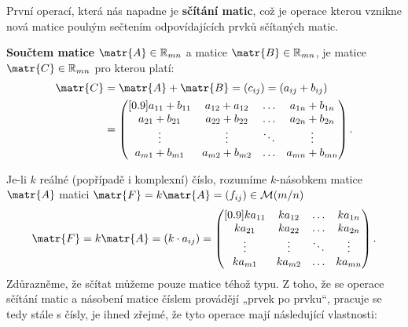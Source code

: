       První operací, která nás napadne je \textbf{sčítání matic}, což je operace kterou vznikne nová 
      matice pouhým sečtením odpovídajících prvků sčítaných matic. 
      \begin{mdframed}[style=mdmathdef]
        \begin{definition} 
          \textbf{Součtem matice} \(\matr{A} \in \mathbb{R}_{mn}\) a matice \(\matr{B} \in 
          \mathbb{R}_{mn}\), je matice \(\matr{C} \in \mathbb{R}_{mn}\) pro kterou platí:
          \begin{gather*}
            \begin{aligned}
              \matr{C}  &=  \matr{A} + \matr{B} = (c_{ij}) = (a_{ij} + b_{ij}) \\
                        &=  \begin{pmatrix}[0.9]
                              a_{11} + b_{11}  & a_{12} + a_{12} & \ldots &  a_{1n} + b_{1n}\\
                              a_{21} + b_{21}  & a_{22} + b_{22} & \ldots &  a_{2n} + b_{2n}\\
                                  \vdots       &     \vdots      & \ddots &      \vdots     \\
                              a_{m1} + b_{m1}  & a_{m2} + b_{m2} & \ldots &  a_{mn} + b_{mn}
                            \end{pmatrix}.
            \end{aligned}
          \end{gather*} 
        \end{definition}
      \end{mdframed}
      Je-li \(k\) reálné (popřípadě i komplexní) číslo, rozumíme \(k\)-násobkem matice \(\matr{A}\) 
      matici \(\matr{F} = k\matr{A} = (f_{ij})\in \mathcal{M}(m/n)\)
      \begin{equation*}
        \matr{F} = k\matr{A} = (k\cdot a_{ij}) = 
                    \begin{pmatrix}[0.9]
                       ka_{11} & ka_{12} & \ldots & ka_{1n} \\
                       ka_{21} & ka_{22} & \ldots & ka_{2n} \\
                       \vdots  & \vdots  & \ddots & \vdots  \\
                       ka_{m1} & ka_{m2} & \ldots & ka_{mn}
                    \end{pmatrix}.
      \end{equation*}
      Zdůrazněme, že sčítat můžeme pouze matice téhož typu. Z toho, že se operace sčítání matic a 
      násobení matice číslem provádějí „prvek po prvku“, pracuje se tedy stále s čísly, je ihned 
      zřejmé, že tyto operace mají následující vlastnosti:
      
